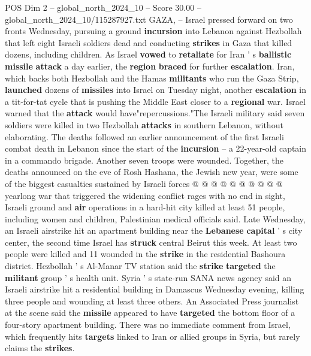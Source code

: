 \begin{textsample}{POS Dim 2 – global\_north\_2024\_10 – Score 30.00 – global\_north\_2024\_10/115287927.txt}  \label{ex:f2_pos_073}
GAZA, -- Israel pressed forward on two fronts Wednesday, pursuing a ground \textbf{incursion} into Lebanon against Hezbollah that left eight Israeli soldiers dead and conducting \textbf{strikes} in Gaza that killed dozens, including children.
As Israel \textbf{vowed} to \textbf{retaliate} for Iran ' s \textbf{ballistic} \textbf{missile} \textbf{attack} a day earlier, the \textbf{region} \textbf{braced} for further \textbf{escalation}.
Iran, which backs both Hezbollah and the Hamas \textbf{militants} who run the Gaza Strip, \textbf{launched} dozens of \textbf{missiles} into Israel on Tuesday night, another \textbf{escalation} in a tit-for-tat cycle that is pushing the Middle East closer to a \textbf{regional} war.
Israel warned that the \textbf{attack} would have"repercussions."The Israeli military said seven soldiers were killed in two Hezbollah \textbf{attacks} in southern Lebanon, without elaborating.
The deaths followed an earlier announcement of the first Israeli combat death in Lebanon since the start of the \textbf{incursion} -- a 22-year-old captain in a commando brigade.
Another seven troops were wounded.
Together, the deaths announced on the eve of Rosh Hashana, the Jewish new year, were some of the biggest casualties sustained by Israeli forces @ @ @ @ @ @ @ @ @ @ yearlong war that triggered the widening conflict rages with no end in sight, Israeli ground and \textbf{air} operations in a hard-hit city killed at least 51 people, including women and children, Palestinian medical officials said.
Late Wednesday, an Israeli airstrike hit an apartment building near the \textbf{Lebanese} \textbf{capital} ' s city center, the second time Israel has \textbf{struck} central Beirut this week.
At least two people were killed and 11 wounded in the \textbf{strike} in the residential Bashoura district.
Hezbollah ' s Al-Manar TV station said the \textbf{strike} \textbf{targeted} the \textbf{militant} group ' s health unit.
Syria ' s state-run SANA news agency said an Israeli airstrike hit a residential building in Damascus Wednesday evening, killing three people and wounding at least three others.
An Associated Press journalist at the scene said the \textbf{missile} appeared to have \textbf{targeted} the bottom floor of a four-story apartment building.
There was no immediate comment from Israel, which frequently hits \textbf{targets} linked to Iran or allied groups in Syria, but rarely claims the \textbf{strikes}.

\end{textsample}
